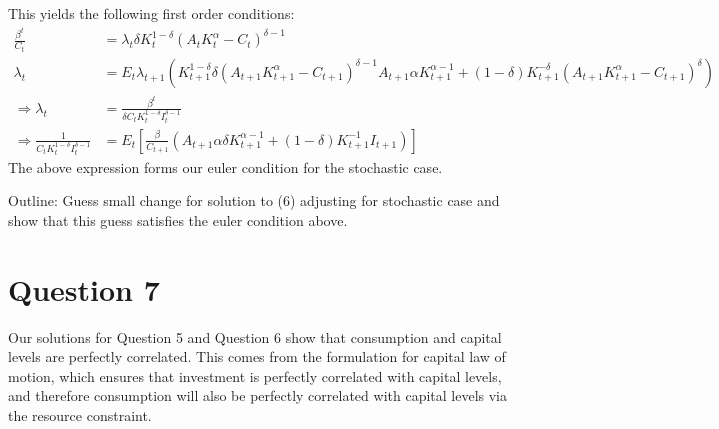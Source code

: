 \documentclass[11pt]{article} %
\begin{document}
This yields the following first order conditions:
\begin{align*}
\frac{\beta^t}{C_t} &= \lambda_t \delta K_t^{1-\delta}(A_tK_t^{\alpha}  - C_t )^{\delta - 1}\\
\lambda_t &= E_t\lambda_{t+1}(K_{t+1}^{1-\delta}\delta(A_{t+1}K_{t+1}^{\alpha}  - C_{t+1} )^{\delta - 1}A_{t+1}\alpha K_{t+1}^{\alpha - 1} + (1-\delta)K_{t+1}^{-\delta} \left( A_{t+1}K_{t+1}^{\alpha}  - C_{t+1} \right)^{\delta})\\
\Rightarrow \lambda_t &= \frac{\beta^t}{\delta C_tK_t^{1-\delta}I_t^{\delta - 1}} \\
\Rightarrow  \frac{1}{C_tK_t^{1-\delta}I_t^{\delta - 1}}  &=  E_t\left[\frac{\beta}{C_{t+1}}(A_{t+1}\alpha \delta K_{t+1}^{\alpha - 1} + (1-\delta)K_{t+1}^{-1}I_{t+1})\right]
\end{align*}
The above expression forms our euler condition for the stochastic case. 

Outline: Guess small change for solution to (6) adjusting for stochastic case and show that this guess satisfies the euler condition above.

\section{Question 7}
Our solutions for Question 5 and Question 6 show that consumption and capital levels are perfectly correlated. This comes from the formulation for capital law of motion, which ensures that investment is perfectly correlated with capital levels, and therefore consumption will also be perfectly correlated with capital levels via the resource constraint.
\end{document}
